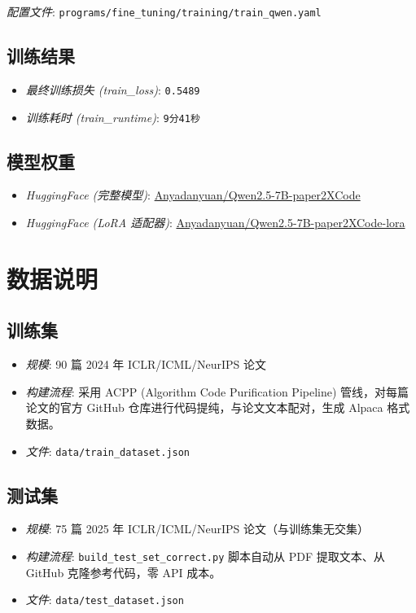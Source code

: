 \documentclass[a4paper]{article}
\begin{document}
\noindent
\textit{配置文件}: \texttt{programs/fine\_tuning/training/train\_qwen.yaml}

\subsection{训练结果}
\begin{itemize}
    \item \textit{最终训练损失 (train\_loss)}: \texttt{0.5489}
    \item \textit{训练耗时 (train\_runtime)}: \texttt{9分41秒}
\end{itemize}


\subsection{模型权重}
\begin{itemize}
    \item \textit{HuggingFace (完整模型)}: \href{https://huggingface.co/Anyadanyuan/Qwen2.5-7B-paper2XCode}{Anyadanyuan/Qwen2.5-7B-paper2XCode}
    \item \textit{HuggingFace (LoRA 适配器)}: \href{https://huggingface.co/Anyadanyuan/Qwen2.5-7B-paper2XCode-lora}{Anyadanyuan/Qwen2.5-7B-paper2XCode-lora}
\end{itemize}

\section{数据说明}

\subsection{训练集}
\begin{itemize}
    \item \textit{规模}: 90 篇 2024 年 ICLR/ICML/NeurIPS 论文
    \item \textit{构建流程}: 采用 ACPP (Algorithm Code Purification Pipeline) 管线，对每篇论文的官方 GitHub 仓库进行代码提纯，与论文文本配对，生成 Alpaca 格式数据。
    \item \textit{文件}: \texttt{data/train\_dataset.json}
\end{itemize}

\subsection{测试集}
\begin{itemize}
    \item \textit{规模}: 75 篇 2025 年 ICLR/ICML/NeurIPS 论文（与训练集无交集）
    \item \textit{构建流程}: \texttt{build\_test\_set\_correct.py} 脚本自动从 PDF 提取文本、从 GitHub 克隆参考代码，零 API 成本。
    \item \textit{文件}: \texttt{data/test\_dataset.json}
\end{itemize}
\end{document}
